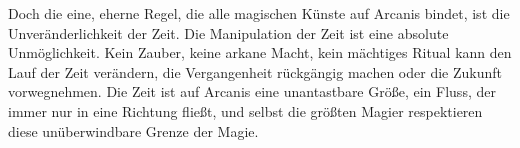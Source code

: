 \documentclass[10pt,a4paper,twocolumn,openany]{book}
\begin{document}
Doch die eine, eherne Regel, die alle magischen Künste auf Arcanis bindet, ist die Unveränderlichkeit der Zeit. Die Manipulation der Zeit ist eine absolute Unmöglichkeit. Kein Zauber, keine arkane Macht, kein mächtiges Ritual kann den Lauf der Zeit verändern, die Vergangenheit rückgängig machen oder die Zukunft vorwegnehmen. Die Zeit ist auf Arcanis eine unantastbare Größe, ein Fluss, der immer nur in eine Richtung fließt, und selbst die größten Magier respektieren diese unüberwindbare Grenze der Magie.


%
%
%
%
%
%
%
%
%
%
%
%
%
%
%
\end{document}
